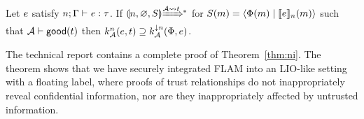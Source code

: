 \begin{theorem}[Noninterference]\label{thm:ni}
Let $e$ satisfy $\hastype{n; \tenv}{\expr}{\type}$.
If $\gconfig{n}{\varnothing}{S} \gstepstos[][\Attacker \filtertrace t]$ for $S(m) = \langle \Phi(m) \mid \llbracket e \rrbracket_n(m) \rangle$ such that $\mathcal{A} \vdash \mathsf{good}(t)$ then $\knowledge{n}(\expr, t) \supseteq \termknowledge{n}(\globalstore, \expr)$.
\end{theorem}

The technical report \cite{techreport} contains a complete proof of Theorem~\ref{thm:ni}. The theorem shows that we have securely integrated FLAM into an LIO-like setting with a floating label, where proofs of trust relationships do not inappropriately reveal confidential information, nor are they inappropriately affected by untrusted information.